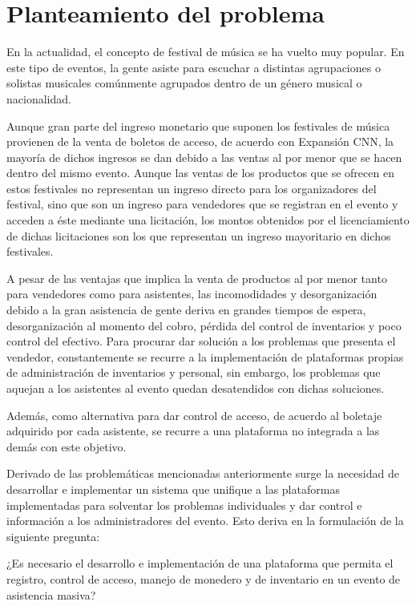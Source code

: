 \section{Planteamiento del problema}

En la actualidad, el concepto de festival de música se ha vuelto muy popular. En este tipo de eventos, la gente asiste para escuchar a distintas agrupaciones o solistas musicales comúnmente agrupados dentro de un género musical o nacionalidad.

Aunque gran parte del ingreso monetario que suponen los festivales de música provienen de la venta de boletos de acceso, de acuerdo con Expansión CNN, la mayoría de dichos ingresos se dan debido a las ventas al por menor que se hacen dentro del mismo evento\cite{Locker2013}. Aunque las ventas de los productos que se ofrecen en estos festivales no representan un ingreso directo para los organizadores del festival, sino que son un ingreso para vendedores que se registran en el evento y acceden a éste mediante una licitación, los montos obtenidos por el licenciamiento de dichas licitaciones son los que representan un ingreso mayoritario en dichos festivales.

A pesar de las ventajas que implica la venta de productos al por menor tanto para vendedores como para asistentes, las incomodidades y desorganización debido a la gran asistencia de gente deriva en grandes tiempos de espera, desorganización al momento del cobro, pérdida del control de inventarios y poco control del efectivo. Para procurar dar solución a los problemas que presenta el vendedor, constantemente se recurre a la implementación de plataformas propias de administración de inventarios y personal, sin embargo, los problemas que aquejan a los asistentes al evento quedan desatendidos con dichas soluciones.

Además, como alternativa para dar control de acceso, de acuerdo al boletaje adquirido por cada asistente, se recurre a una plataforma no integrada a las demás con este objetivo.

Derivado de las problemáticas mencionadas anteriormente surge la necesidad de desarrollar e implementar un sistema que unifique a las plataformas implementadas para solventar los problemas individuales y dar control e información a los administradores del evento. Esto deriva en la formulación de la siguiente pregunta:

¿Es necesario el desarrollo e implementación de una plataforma que permita el registro, control de acceso, manejo de monedero y de inventario en un evento de asistencia masiva?
